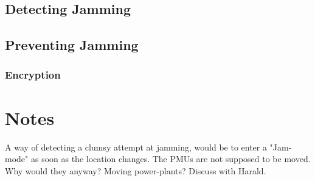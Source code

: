 \documentclass[12pt,english,a4paper]{article}
\begin{document}
\subsection{Detecting Jamming}

\subsection{Preventing Jamming}
\subsubsection{Encryption}

\section{Notes}
A way of detecting a clumsy attempt at jamming, would be to enter a "Jam-mode" as soon as the location changes. The PMUs are not supposed to be moved. Why would they anyway? Moving power-plants? Discuss with Harald.

\newpage
\printbibliography[title={Complete Bibliography},heading=bibintoc]
\end{document}
